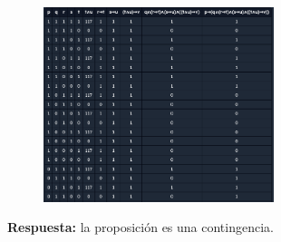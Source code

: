 \documentclass[12pt]{article}
\begin{document}
\begin{itemize}
\begin{enumerate}
                    \begin{figure}[!h]
                        \centering
                        \includegraphics[width=0.6\textwidth]{Img/Tarea8_b_ej5.png}
                    \end{figure} \vspace{0.5cm}\vspace{0.5cm}
                    \par\textbf{Respuesta: } la proposición es una contingencia. \vspace{0.5cm}

            \end{enumerate}
        \end{itemize}
\end{document}
